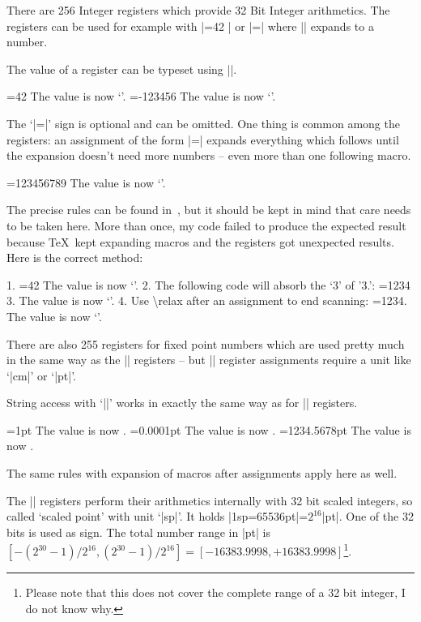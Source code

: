 \begin{command}{\count{}}
	There are 256 Integer registers which provide 32 Bit Integer arithmetics. The registers can be used for example with |=42 | or |=\macro | where |\macro| expands to a number.

	The value of a register can be typeset using |\the|.
\begin{codeexample}[]
=42
The value is now `\the{}'. 
\def\macro{-123456}
=\macro 
The value is now `\the{}'.
\end{codeexample}
	
	The `|=|' sign is optional and can be omitted. One thing is common among the registers: an assignment of the form |=|\meta{$\cdots$} expands everything which follows until the expansion doesn't need more numbers -- even more than one following macro.
\begin{codeexample}[]
\def\firstmacro{123}
\def\secondmacro{456}
\def\thirdmacro{789}
=\firstmacro\secondmacro\thirdmacro
The value is now `\the{}'.
\end{codeexample}
 The precise rules can be found in~\cite{texbook}, but it should be kept in mind that care needs to be taken here. More than once, my code failed to produce the expected result because \TeX\ kept expanding macros and the registers got unexpected results. Here is the correct method:
\begin{codeexample}[]
1. =42 %
The value is now `\the{}'.
2. The following code will absorb the `3' of '3.':
\def\macro{1234}
=\macro %
3. The value is now `\the{}'.
4. Use \textbackslash relax after an assignment to end scanning:
=\macro{}. The value is now `\the{}'.
\end{codeexample}
\end{command}

\begin{command}{\dimen{}}
	There are also 255 registers for fixed point numbers which are used pretty much in the same way as the |\count| registers -- but |\dimen| register assignments require a unit like `|cm|' or `|pt|'.

	String access with `|\the|' works in exactly the same way as for |\count| registers.
\begin{codeexample}[]
=1pt
The value is now \the{}.
=0.0001pt
The value is now \the{}.
\def\macro{1234.5678}
=\macro pt
The value is now \the{}.
\end{codeexample}
	The same rules with expansion of macros after assignments apply here as well.

	The |\dimen| registers perform their arithmetics internally with 32 bit scaled integers, so called `scaled point' with unit `|sp|'. It holds |1sp=65536pt|=$2^{16}$|pt|. One of the 32 bits is used as sign. The total number range in |pt| is $[-(2^{30}-1)/2^{16}, (2^{30}-1)/2^{16} ] = [-16383.9998,+16383.9998]$\footnote{Please note that this does not cover the complete range of a 32 bit integer, I do not know why.}.
\end{command}

